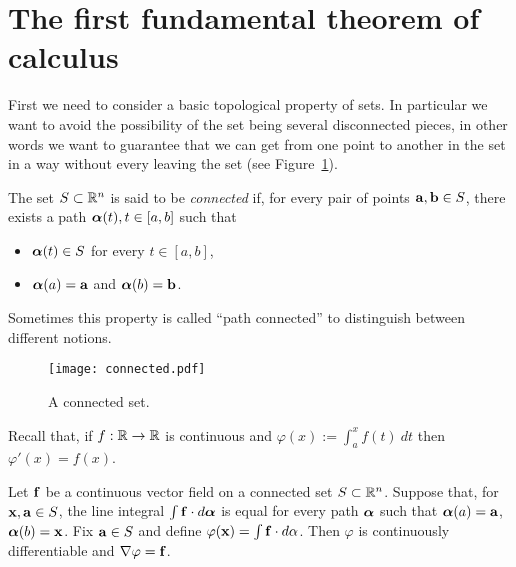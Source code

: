 \section{The first fundamental theorem of calculus}

First we need to consider a basic topological property of sets.
In particular we want to avoid the possibility of the set being several disconnected pieces, in other words we want to guarantee that we can get from one point to another in the set in a way without every leaving the set (see Figure~\ref{fig:connected}).

\begin{definition}[connected]
    The set \(S\subset \bR^n\) is said to be \emph{connected} if, for every pair of points \(\aa,\bb\in S\), there exists a path \(\aalpha(t), t\in[a,b]\) such that
    \begin{itemize}
        \item \(\aalpha(t)\in S\) for every \( t\in[a,b]\),
        \item \(\aalpha(a)=\aa\) and \(\aalpha(b)=\bb\).
    \end{itemize}
\end{definition}

\noindent
Sometimes this property is called ``path connected'' to distinguish between different notions.

\begin{figure}[htbp]
    \begin{center}
        \texttt{[image: connected.pdf]}
        \caption{A connected set.}%
        \label{fig:connected}
    \end{center}
\end{figure}

Recall that, if \(f:\bR \to \bR\) is continuous and \(\varphi(x) := \int_a^x f(t) \ dt\) then \(\varphi'(x) = f(x)\).

\begin{theorem}
    Let \(\ff\) be a continuous vector field on a connected set \(S \subset \bR^n\).
    Suppose that, for \(\xx,\aa\in S\), the line integral \(\int \ff \cdot d\aalpha\) is equal for every path \(\aalpha\) such that \(\aalpha(a)=\aa\), \(\aalpha(b)=\xx\).
    Fix \(\aa\in S\) and define \(\varphi(\xx)= \int \ff \cdot d\alpha\).
    Then \(\varphi\) is continuously differentiable and \(\nabla \varphi = \ff\).
\end{theorem}

